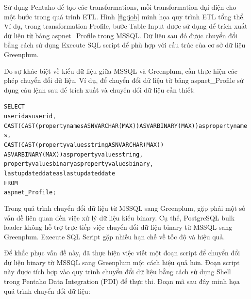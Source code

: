 \documentclass{article}[14pt]
\begin{document}
Sử dụng Pentaho để tạo các transformations, mỗi transformation đại diện cho một bước trong quá trình ETL. Hình \ref{fig:job} minh họa quy trình ETL tổng thể. Ví dụ, trong transformation Profile, bước Table Input được sử dụng để trích xuất dữ liệu từ bảng aspnet\_Profile trong MSSQL. Dữ liệu sau đó được chuyển đổi bằng cách sử dụng Execute SQL script để phù hợp với cấu trúc của cơ sở dữ liệu Greenplum.

Do sự khác biệt về kiểu dữ liệu giữa MSSQL và Greenplum, cần thực hiện các phép chuyển đổi dữ liệu. Ví dụ, để chuyển đổi dữ liệu từ bảng aspnet\_Profile sử dụng câu lệnh sau để trích xuất và chuyển đổi dữ liệu cần thiết:

\begin{mdframed}[backgroundcolor=white, linecolor=black, roundcorner=5pt]
\begin{alltt}
SELECT
    userid as userid,
    CAST(CAST(propertynames AS NVARCHAR(MAX)) AS VARBINARY(MAX)) as propertynames,
    CAST(CAST(propertyvaluesstring AS NVARCHAR(MAX)) 
    AS VARBINARY(MAX)) as propertyvaluesstring,
    propertyvaluesbinary as propertyvaluesbinary,
    lastupdateddate as lastupdateddate
FROM
    aspnet_Profile;
\end{alltt}
\end{mdframed}

Trong quá trình chuyển đổi dữ liệu từ MSSQL sang Greenplum, gặp phải một số vấn đề liên quan đến việc xử lý dữ liệu kiểu binary. Cụ thể, PostgreSQL bulk loader không hỗ trợ trực tiếp việc chuyển đổi dữ liệu binary từ MSSQL sang Greenplum. Execute SQL Script gặp nhiều hạn chế về tốc độ và hiệu quả.

Để khắc phục vấn đề này, đã thực hiện việc viết một đoạn script để chuyển đổi dữ liệu binary từ MSSQL sang Greenplum một cách hiệu quả hơn. Đoạn script này được tích hợp vào quy trình chuyển đổi dữ liệu bằng cách sử dụng Shell trong Pentaho Data Integration (PDI) để thực thi. Đoạn mã sau đây minh họa quá trình chuyển đổi dữ liệu:
\end{document}
